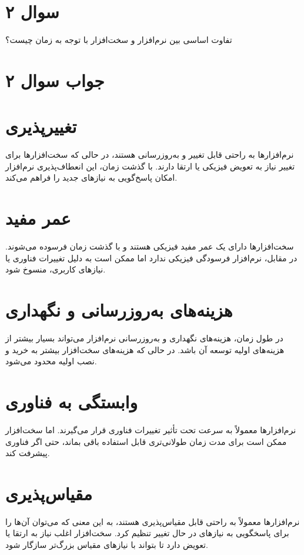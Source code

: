 \section*{سوال ۲}

تفاوت اساسی بین نرم‌افزار و سخت‌افزار با توجه به زمان چیست؟

\section*{جواب سوال ۲}


\section*{تغییرپذیری}
نرم‌افزارها به راحتی قابل تغییر و به‌روزرسانی هستند، در حالی که سخت‌افزارها برای تغییر نیاز به تعویض فیزیکی یا ارتقا دارند. با گذشت زمان، این انعطاف‌پذیری نرم‌افزار امکان پاسخ‌گویی به نیازهای جدید را فراهم می‌کند.

\section*{عمر مفید}
سخت‌افزارها دارای یک عمر مفید فیزیکی هستند و با گذشت زمان فرسوده می‌شوند. در مقابل، نرم‌افزار فرسودگی فیزیکی ندارد اما ممکن است به دلیل تغییرات فناوری یا نیازهای کاربری، منسوخ شود.

\section*{هزینه‌های به‌روزرسانی و نگهداری}
در طول زمان، هزینه‌های نگهداری و به‌روزرسانی نرم‌افزار می‌تواند بسیار بیشتر از هزینه‌های اولیه توسعه آن باشد. در حالی که هزینه‌های سخت‌افزار بیشتر به خرید و نصب اولیه محدود می‌شود.

\section*{وابستگی به فناوری}
نرم‌افزارها معمولاً به سرعت تحت تأثیر تغییرات فناوری قرار می‌گیرند. اما سخت‌افزار ممکن است برای مدت زمان طولانی‌تری قابل استفاده باقی بماند، حتی اگر فناوری پیشرفت کند.

\section*{مقیاس‌پذیری}
نرم‌افزارها معمولاً به راحتی قابل مقیاس‌پذیری هستند، به این معنی که می‌توان آن‌ها را برای پاسخگویی به نیازهای در حال تغییر تنظیم کرد. سخت‌افزار اغلب نیاز به ارتقا یا تعویض دارد تا بتواند با نیازهای مقیاس بزرگ‌تر سازگار شود.